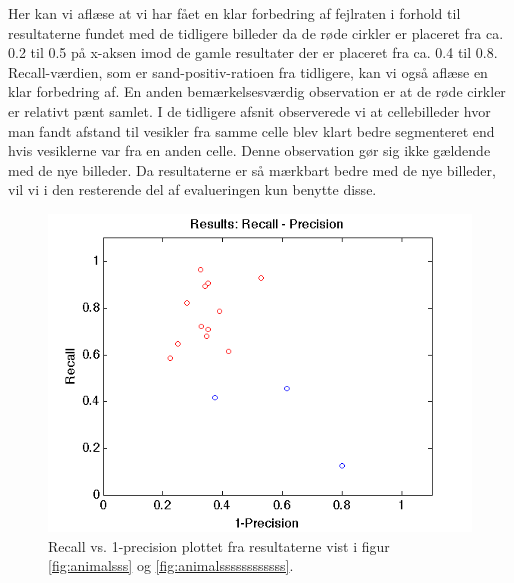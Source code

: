 Her kan vi aflæse at vi har fået en klar forbedring af fejlraten i forhold til resultaterne fundet med de tidligere billeder da de røde cirkler er placeret fra ca. 0.2 til 0.5 på x-aksen imod de gamle resultater der er placeret fra ca. 0.4 til 0.8. Recall-værdien, som er sand-positiv-ratioen fra tidligere, kan vi også aflæse en klar forbedring af. En anden bemærkelsesværdig observation er at de røde cirkler er relativt pænt samlet. I de tidligere afsnit observerede vi at cellebilleder hvor man fandt afstand til vesikler fra samme celle blev klart bedre segmenteret end hvis vesiklerne var fra en anden celle. Denne observation gør sig ikke gældende med de nye billeder. Da resultaterne er så mærkbart bedre med de nye billeder, vil vi i den resterende del af evalueringen kun benytte disse.

\begin{figure}[H]
	\centering
	\includegraphics[scale=0.9]{files/postmethod/img/recallvsprecision.png}
	\caption{Recall vs. 1-precision plottet fra resultaterne vist i figur \ref{fig:animalsss} og \ref{fig:animalssssssssssss}.\label{fig:postmethod_recallprec}}
\end{figure}

